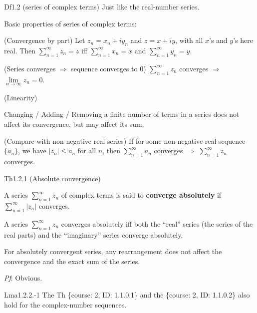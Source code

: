 \documentclass{article}
\begin{document}
\begin{Df}{Df1.2 (series of complex terms)}
    Just like the real-number series.
\end{Df}

\begin{Rmk}{}
    \textcolor{Th}{Basic properties of series of complex terms:
    \begin{compactenum}
        \item (Convergence by part) Let $z_n = x_n+iy_n$ and $z=x+iy$, with all $x$'s and $y$'s here real. Then $\sum_{n=1}^{\infty} z_n = z$ iff $\sum_{n=1}^{\infty} x_n = x$ and $\sum_{n=1}^{\infty} y_n = y$.
        \item (Series converges $\Rightarrow$ sequence converges to $0$) $\sum_{n=1}^{\infty} z_n$ converges $\Rightarrow$ $\lim\limits_{n\to\infty} z_n = 0$.
        \item (Linearity)
        \item Changing / Adding / Removing a finite number of terms in a series does not affect its convergence, but may affect its sum.
        \item (Compare with non-negative real series) If for some non-negative real sequence $\{a_n\}$, we have $|z_n|\leq a_n$ for all $n$, then $\sum_{n=1}^{\infty} a_n$ converges $\Rightarrow$ $\sum_{n=1}^{\infty} z_n$ converges.
    \end{compactenum}}
\end{Rmk}

\begin{Th}{Th1.2.1 (Absolute convergence)}
    \begin{compactenum}
        \item \textcolor{Df}{A series $\sum_{n=1}^{\infty} z_n$ of complex terms is said to \textbf{converge absolutely} if $\sum_{n=1}^{\infty} |z_n|$ converges.}
        \item A series $\sum_{n=1}^{\infty} z_n$ converges absolutely iff both the ``real'' series (the series of the real parts) and the ``imaginary'' series converge absolutely.
        \item For absolutely convergent series, any rearrangement does not affect the convergence and the exact sum of the series.
    \end{compactenum}
    \tcblower
    \textit{Pf}: Obvious.
\end{Th}

\begin{Th}{Lma1.2.2.-1}
    The Th \{course: 2, ID: 1.1.0.1\} and the \{course: 2, ID: 1.1.0.2\} also hold for the complex-number sequences.
\end{Th}
\end{document}
